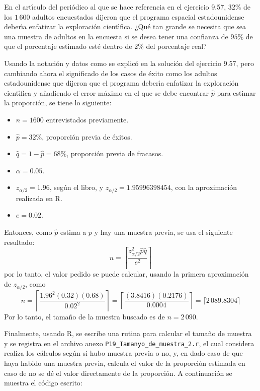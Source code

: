 \begin{enunciado}
 En el art\'{\i}culo del peri\'odico al que se hace referencia en el ejercicio 9.57, $32\%$ de los $1\,600$ adultos encuestados dijeron que el programa espacial estadounidense deber\'{\i}a enfatizar la exploraci\'on cient\'{\i}fica. ¿Qu\'e tan grande se necesita que sea una muestra de adultos en la encuesta si se desea tener una confianza de $95\%$ de que el porcentaje estimado est\'e dentro de $2\%$ del porcentaje real?
\end{enunciado}

\begin{solucion}
 Usando la notaci\'on y datos como se explic\'o en la soluci\'on del ejercicio 9.57, pero cambiando ahora el significado de los casos de \'exito como los adultos estadounidense que dijeron que el programa deber\'{\i}a enfatizar la exploraci\'on cient\'{\i}fica y a\~nadiendo el error m\'aximo en el que se debe encontrar $\hat{p}$ para estimar la proporci\'on, se tiene lo siguiente:
 \begin{itemize}
  \item $n=1600$ entrevistados previamente.
  \item $\hat{p} = 32\%$, proporci\'on previa de \'exitos.
  \item $\hat{q} = 1-\hat{p} = 68\%$, proporci\'on previa de fracasos.
  \item $\alpha=0.05$.
  \item $z_{\alpha/2} = 1.96$, seg\'un el libro, y $z_{\alpha/2} = 1.95996398454$, con la aproximaci\'on realizada en R.
  \item $e=0.02$.
 \end{itemize}
 Entonces, como $\hat{p}$ estima a $p$ y hay una muestra previa, se usa el siguiente resultado:
 \begin{equation*}
  n = \left\lceil \frac{z_{\alpha/2}^2\hat{p}\hat{q}}{e^2} \right\rceil
 \end{equation*}
 por lo tanto, el valor pedido se puede calcular, usando la primera aproximaci\'on de $z_{\alpha/2}$, como
 \begin{equation*}
  n = \left\lceil \frac{1.96^2(0.32)(0.68)}{0.02^2} \right\rceil = \left\lceil \frac{(3.8416)(0.2176)}{0.0004} \right\rceil = \lceil 2\,089.8304 \rceil
 \end{equation*}
 Por lo tanto, el tama\~no de la muestra buscado es de $n = 2\,090$.
 \par 
 Finalmente, usando R, se escribe una rutina para calcular el tama\~no de muestra y se registra en el archivo anexo \texttt{P19\_Tamanyo\_de\_muestra\_2.r}, el cual considera realiza los c\'alculos seg\'un si hubo muestra previa o no, y, en dado caso de que haya habido una muestra previa, calcula el valor de la proporci\'on estimada en caso de no se d\'e el valor directamente de la proporci\'on. A continuaci\'on se muestra el c\'odigo escrito:

\end{solucion}
